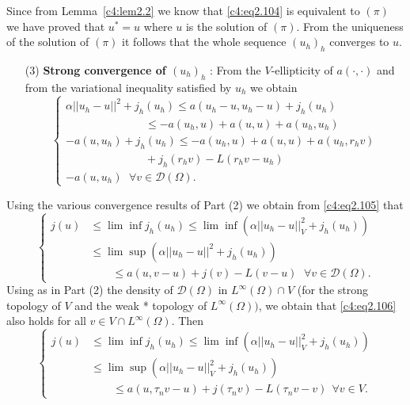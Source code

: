 Since from Lemma~\ref{c4:lem2.2} we know that \eqref{c4:eq2.104} is
equivalent to $(\pi)$ we have proved that $u^* = u$ where $u$ is the
solution of $(\pi)$. From the uniqueness of the solution of $(\pi)$ it
follows that the whole sequence $(u_h)_h$ converges to $u$. 
\begin{enumerate}
\item[(3)] {\bf Strong convergence of $(u_h)_h$} :  From the
  $V$-ellipticity of $a(\cdot, \cdot)$ and from the variational
  inequality satisfied by $u_h$ we obtain  
\begin{equation}
\begin{cases}
\alpha ||u_h - u||^2 + j_h(u_h) \leq a(u_h - u, u_h - u) + j_h(u_h)\\
\hspace{3cm}\leq -a(u_h, u) + a(u, u) + a(u_h, u_h)\\ 
-a(u, u_h) + j_h(u_h) \leq -a(u_h, u) + a(u, u) + a(u_h, r_h v)\\ 
\hspace{3cm} + j_h(r_h v) - L(r_h v - u_h)\\ 
-a(u, u_h) ~~\, \forall v \in \mathscr{D}(\Omega).
\end{cases}\tag{2.105}\label{c4:eq2.105}
\end{equation}
\end{enumerate}
Using the various convergence results of Part (2) we obtain from \eqref{c4:eq2.105} that 
\begin{equation}
\begin{cases}
j(u) & \leq \lim \inf j_h(u_h) \leq \lim \inf (\alpha ||u_h - u||^2_V
+ j_h (u_h))\\ 
& \leq \lim \sup (\alpha ||u_h - u||^2 + j_h(u_h))\\ 
& \qquad \leq a(u, v - u) + j(v) - L(v - u) ~~\, \forall v \in \mathscr{D}(\Omega).
\end{cases}\tag{2.106}\label{c4:eq2.106}
\end{equation}
Using as in Part (2) the density of $\mathscr{D}(\Omega)$ in $L^\infty(\Omega) \cap V$ (for the strong topology of $V$ and the weak * topology of $L^\infty(\Omega))$, we obtain that \eqref{c4:eq2.106} also holds for all $v \in V \cap L^\infty(\Omega)$. Then 
\begin{equation}
\begin{cases}
j(u) & \leq \lim \inf j_h(u_h) \leq \lim \inf (\alpha ||u_h - u||^2_V
+ j_h(u_h)) \\ 
& \leq \lim \sup (\alpha ||u_h - u||^2_V + j_h(u_h))\\ 
& \qquad \leq a(u, \tau_n v - u) + j
(\tau_n v) - L(\tau_n v - v) ~~\forall v \in V.
\end{cases}\tag{2.107}\label{c4:eq2.107}
\end{equation}
